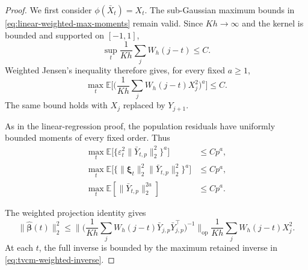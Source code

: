 \documentclass[12pt]{article}
\def\E{\mathbb{E}}
\numberwithin{equation}{section}
\begin{document}
\begin{proof}
We first consider $\phi(\bar X_t)=X_t$.
The sub-Gaussian maximum bounds in
\eqref{eq:linear-weighted-max-moments} remain valid.
Since $Kh\to\infty$ and the kernel is bounded and supported
on $[-1,1]$,
\[
\sup_t\frac1{Kh}\sum_jW_h(j-t)\leq C.
\]
Weighted Jensen's inequality therefore gives, for every fixed
$a\geq1$,
\begin{equation}
\label{eq:tvcm-weighted-local-response}
\max_t
\E\big[
\big(
\frac1{Kh}\sum_jW_h(j-t)X_j^2
\big)^a
\big]
\leq C.
\end{equation}
The same bound holds with $X_j$ replaced by $Y_{j+1}$.

As in the linear-regression proof, the population residuals
have uniformly bounded moments of every fixed order.
Thus
\begin{equation}
\label{eq:tvcm-weighted-evaluation-moments}
\begin{aligned}
\max_t
\E\big[
\{\varepsilon_t^2\|\bar Y_{t,p}\|_2^2\}^a
\big]
&\leq Cp^a,\\
\max_t
\E\big[
\{\|\boldsymbol\xi_t\|_2^2
\|\bar Y_{t,p}\|_2^2\}^a
\big]
&\leq Cp^a,\\
\max_t\E[\|\bar Y_{t,p}\|_2^{2a}]
&\leq Cp^a.
\end{aligned}
\end{equation}

The weighted projection identity gives
\begin{equation}
\label{eq:tvcm-weighted-beta-bound}
\|\hat{\boldsymbol\beta}(t)\|_2^2
\leq
\Big\|
\big(
\frac1{Kh}\sum_jW_h(j-t)
\bar Y_{j,p}\bar Y_{j,p}^\top
\big)^{-1}
\Big\|_{\mathrm{op}}
\frac1{Kh}\sum_jW_h(j-t)X_j^2.
\end{equation}
At each $t$, the full inverse is bounded by the maximum
retained inverse in \eqref{eq:tvcm-weighted-inverse}.


\end{proof}
\end{document}
